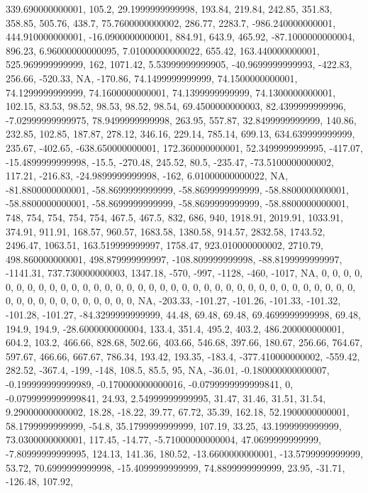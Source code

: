 \documentclass[
]{article}
\begin{document}
339.690000000001, 105.2, 29.1999999999998, 193.84, 219.84, 242.85,
351.83, 358.85, 505.76, 438.7, 75.7600000000002, 286.77, 2283.7,
-986.240000000001, 444.910000000001, -16.0900000000001, 884.91, 643.9,
465.92, -87.1000000000004, 896.23, 6.96000000000095, 7.01000000000022,
655.42, 163.440000000001, 525.969999999999, 162, 1071.42,
5.53999999999905, -40.9699999999993, -422.83, 256.66, -520.33, NA,
-170.86, 74.1499999999999, 74.1500000000001, 74.1299999999999,
74.1600000000001, 74.1399999999999, 74.1300000000001, 102.15, 83.53,
98.52, 98.53, 98.52, 98.54, 69.4500000000003, 82.4399999999996,
-7.02999999999975, 78.9499999999998, 263.95, 557.87, 32.8499999999999,
140.86, 232.85, 102.85, 187.87, 278.12, 346.16, 229.14, 785.14, 699.13,
634.639999999999, 235.67, -402.65, -638.650000000001, 172.360000000001,
52.3499999999995, -417.07, -15.4899999999998, -15.5, -270.48, 245.52,
80.5, -235.47, -73.5100000000002, 117.21, -216.83, -24.9899999999998,
-162, 6.01000000000022, NA, -81.8800000000001, -58.8699999999999,
-58.8699999999999, -58.8800000000001, -58.8800000000001,
-58.8699999999999, -58.8699999999999, -58.8800000000001, 748, 754, 754,
754, 754, 467.5, 467.5, 832, 686, 940, 1918.91, 2019.91, 1033.91,
374.91, 911.91, 168.57, 960.57, 1683.58, 1380.58, 914.57, 2832.58,
1743.52, 2496.47, 1063.51, 163.519999999997, 1758.47, 923.010000000002,
2710.79, 498.860000000001, 498.879999999997, -108.809999999998,
-88.8199999999997, -1141.31, 737.730000000003, 1347.18, -570, -997,
-1128, -460, -1017, NA, 0, 0, 0, 0, 0, 0, 0, 0, 0, 0, 0, 0, 0, 0, 0, 0,
0, 0, 0, 0, 0, 0, 0, 0, 0, 0, 0, 0, 0, 0, 0, 0, 0, 0, 0, 0, 0, 0, 0, 0,
0, 0, 0, 0, 0, 0, 0, 0, NA, -203.33, -101.27, -101.26, -101.33, -101.32,
-101.28, -101.27, -84.3299999999999, 44.48, 69.48, 69.48,
69.4699999999998, 69.48, 194.9, 194.9, -28.6000000000004, 133.4, 351.4,
495.2, 403.2, 486.200000000001, 604.2, 103.2, 466.66, 828.68, 502.66,
403.66, 546.68, 397.66, 180.67, 256.66, 764.67, 597.67, 466.66, 667.67,
786.34, 193.42, 193.35, -183.4, -377.410000000002, -559.42, 282.52,
-367.4, -199, -148, 108.5, 85.5, 95, NA, -36.01, -0.180000000000007,
-0.199999999999989, -0.170000000000016, -0.0799999999999841, 0,
-0.0799999999999841, 24.93, 2.54999999999995, 31.47, 31.46, 31.51,
31.54, 9.29000000000002, 18.28, -18.22, 39.77, 67.72, 35.39, 162.18,
52.1900000000001, 58.1799999999999, -54.8, 35.1799999999999, 107.19,
33.25, 43.1999999999999, 73.0300000000001, 117.45, -14.77,
-5.71000000000004, 47.0699999999999, -7.80999999999995, 124.13, 141.36,
180.52, -13.6600000000001, -13.5799999999999, 53.72, 70.6999999999998,
-15.4099999999999, 74.8899999999999, 23.95, -31.71, -126.48, 107.92,
\end{document}
